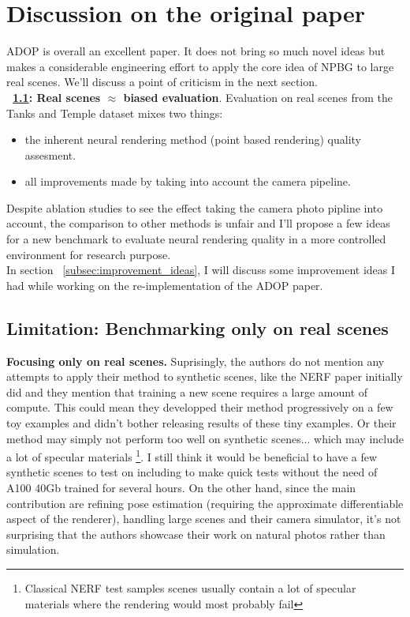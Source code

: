 \section{Discussion on the original paper}
\label{sec:discussion}
ADOP\cite{Aruckert2022adop} is overall an excellent paper. It does not bring so much novel ideas but makes a considerable engineering effort to apply the core idea of NPBG \cite{Aliev2020} to large real scenes.
We'll discuss a point of criticism in the next section.\\
\noindent \textbf{~\ref{subsec:limits_real_scenes}{: Real scenes $\approx$ biased evaluation}}. Evaluation on real scenes from the Tanks and Temple dataset \cite{Knapitsch2017TanksAndTemples} mixes two things:
\begin{itemize}
    \item the inherent neural rendering method (point based rendering) quality assesment.
    \item all improvements made by taking into account the camera pipeline.
\end{itemize}
Despite ablation studies to see the effect taking the camera photo pipline into account, the comparison to other methods is unfair and I'll propose a few ideas for a new benchmark to evaluate neural rendering quality in a more controlled environment for research purpose.\\
In section ~\ref{subsec:improvement_ideas}, I will discuss some improvement ideas I had while working on the re-implementation of the ADOP paper.



\subsection{Limitation: Benchmarking only on real scenes}
\label{subsec:limits_real_scenes}
\noindent \textbf{Focusing only on real scenes.}
Suprisingly, the authors do not mention any attempts to apply their method to synthetic scenes, like the NERF paper initially did and they mention that training a new scene requires a large amount of compute. This could mean they developped their method progressively on a few toy examples and didn't bother releasing results of these tiny examples. Or their method may simply not perform too well on synthetic scenes... which may include a lot of specular materials \footnote{Classical NERF test samples scenes usually contain a lot of specular materials where the rendering would most probably fail}. I still think it would be beneficial to have a few synthetic scenes to test on including to make quick tests without the need of A100 40Gb trained for several hours.
On the other hand, since the main contribution are refining pose estimation (requiring the approximate differentiable aspect of the renderer), handling large scenes and their camera simulator, it's not surprising that the authors showcase their work on natural photos rather than simulation. 

